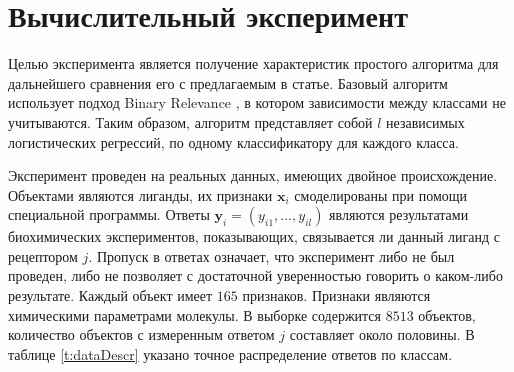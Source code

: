 \documentclass[12pt,twoside]{article}
\newcommand{\x}{\mathbf{x}}
\newcommand{\y}{\mathbf{y}}
\begin{document}
\section{Вычислительный эксперимент}

Целью эксперимента является получение характеристик простого алгоритма для дальнейшего сравнения его с предлагаемым в статье. Базовый алгоритм использует подход Binary Relevance \cite{weiwei2010}, в котором зависимости между классами не учитываются. Таким образом, алгоритм представляет собой $l$ независимых логистических регрессий, по одному классификатору для каждого класса.

Эксперимент проведен на реальных данных, имеющих двойное происхождение. Объектами являются лиганды, их признаки $\x_i$ смоделированы при помощи специальной программы. Ответы $\y_i=(y_{i1},...,y_{il})$ являются результатами биохимических экспериментов, показывающих, связывается ли данный лиганд с рецептором $j$. Пропуск в ответах означает, что эксперимент либо не был проведен, либо не позволяет с достаточной уверенностью говорить о каком-либо результате. Каждый объект имеет $165$ признаков. Признаки являются химическими параметрами молекулы. В выборке содержится $8513$ объектов, количество объектов с измеренным ответом $j$ составляет около половины. В таблице \ref{t:dataDescr} указано точное распределение ответов по классам.
\end{document}
